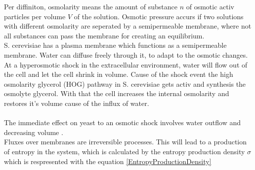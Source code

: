 Per diffiniton, osmolarity means the amount of substance $n$ of osmotic activ particles per volume $V$ of the solution. Osmotic pressure accurs if two solutions with different osmolarity are seperated by a semipermeable membrane, where not all substances can pass the membrane for creating an equilibrium.\\
S. cerevisiae has a plasma membrane which functions as a semipermeable membrane. Water can diffuse freely through it, to adapt to the osmotic changes. At a hyperosmotic shock in the extracellular environment, water will flow out of the cell and let the cell shrink in volume. Cause of the shock event the high osmolarity glycerol (HOG) pathway in S. cerevisiae gets activ and synthesis the osmolyte glycerol. With that the cell increases the internal osmolarity and restores it’s volume cause of the influx of water.\\\\
The immediate effect on yeast to an osmotic shock involves water outflow and decreasing volume \cite{ASimpleMathematicalModel}.\\

Fluxes over membranes are irreversible processes. This will lead to a production of entropy in the system, which is calculated by the entropy production density $\sigma$ which is respresented with the equation \ref{EntropyProductionDensity}

